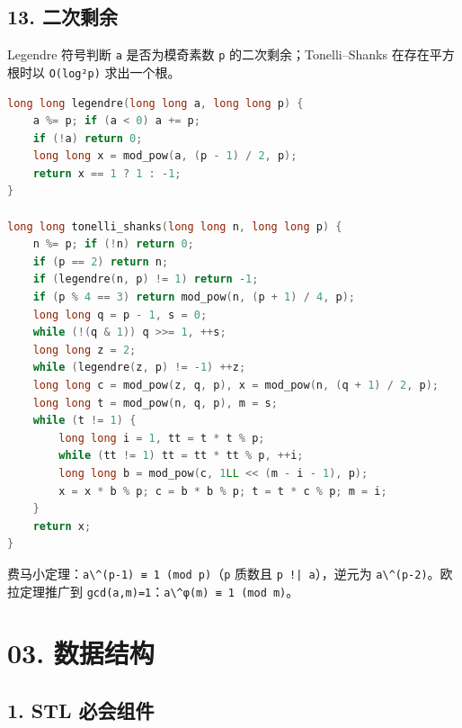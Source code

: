 \section{13. 二次剩余}\label{ux4e8cux6b21ux5269ux4f59}

Legendre 符号判断 \passthrough{\lstinline!a!} 是否为模奇素数 \passthrough{\lstinline!p!} 的二次剩余；Tonelli--Shanks 在存在平方根时以 \passthrough{\lstinline!O(log²p)!} 求出一个根。

\begin{lstlisting}[language={C++}]
long long legendre(long long a, long long p) {
    a %= p; if (a < 0) a += p;
    if (!a) return 0;
    long long x = mod_pow(a, (p - 1) / 2, p);
    return x == 1 ? 1 : -1;
}

long long tonelli_shanks(long long n, long long p) {
    n %= p; if (!n) return 0;
    if (p == 2) return n;
    if (legendre(n, p) != 1) return -1;
    if (p % 4 == 3) return mod_pow(n, (p + 1) / 4, p);
    long long q = p - 1, s = 0;
    while (!(q & 1)) q >>= 1, ++s;
    long long z = 2;
    while (legendre(z, p) != -1) ++z;
    long long c = mod_pow(z, q, p), x = mod_pow(n, (q + 1) / 2, p);
    long long t = mod_pow(n, q, p), m = s;
    while (t != 1) {
        long long i = 1, tt = t * t % p;
        while (tt != 1) tt = tt * tt % p, ++i;
        long long b = mod_pow(c, 1LL << (m - i - 1), p);
        x = x * b % p; c = b * b % p; t = t * c % p; m = i;
    }
    return x;
}
\end{lstlisting}

费马小定理：\passthrough{\lstinline!a\^(p-1) ≡ 1 (mod p)!}（\passthrough{\lstinline!p!} 质数且 \passthrough{\lstinline"p !| a"}），逆元为 \passthrough{\lstinline!a\^(p-2)!}。欧拉定理推广到 \passthrough{\lstinline!gcd(a,m)=1!}：\passthrough{\lstinline!a\^φ(m) ≡ 1 (mod m)!}。

\chapter{03. 数据结构}\label{ux6570ux636eux7ed3ux6784}

\section{1. STL 必会组件}\label{stl-ux5fc5ux4f1aux7ec4ux4ef6}

